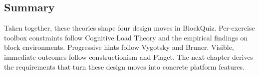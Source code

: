\subsection{Summary}
Taken together, these theories shape four design moves in BlockQuiz. Per-exercise toolbox constraints 
follow Cognitive Load Theory and the empirical findings on block environments. 
Progressive hints follow Vygotsky and Bruner. Visible, immediate outcomes follow constructionism and Piaget. The next chapter derives 
the requirements that turn these design moves into concrete platform features. 
